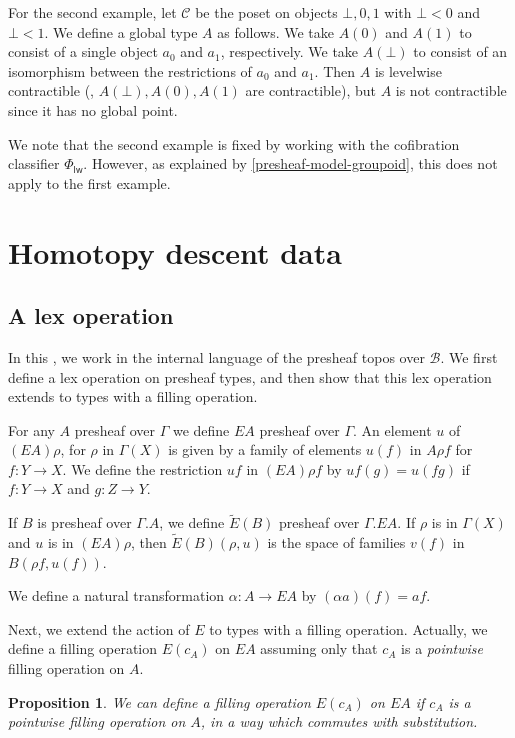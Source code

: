 \documentclass[10pt,a4paper,draft]{article}
\newcommand{\CC}{{\mathcal C}}
\newcommand{\BB}{\mathcal{B}}
\newcommand{\E}{E}
\newcommand{\EE}{\tilde{E}}
\renewcommand{\~}{\widetilde}
\newcommand{\levelwise}{\mathsf{lw}}
\newcommand{\cofunivLW}{\Phi_{\levelwise}}
\newtheorem{proposition}[theorem]{Proposition}
\theoremstyle{definition}
\theoremstyle{remark} %
\begin{document}
For the second example, let $\CC$ be the poset on objects $\bot, 0, 1$ with $\bot < 0$ and $\bot < 1$.
We define a global type $A$ as follows.
We take $A(0)$ and $A(1)$ to consist of a single object $a_0$ and $a_1$, respectively.
We take $A(\bot)$ to consist of an isomorphism between the restrictions of $a_0$ and $a_1$.
Then $A$ is levelwise contractible (\ie, $A(\bot), A(0), A(1)$ are contractible), but $A$ is not contractible since it has no global point.

We note that the second example is fixed by working with the cofibration classifier $\cofunivLW$.
However, as explained by \cref{presheaf-model-groupoid}, this does not apply to the first example.

\section{Homotopy descent data}

\subsection{A lex operation}
\label{sec:a-lex-operation}

In this , we work in the internal language of the presheaf topos
over $\BB$.
We first define a lex operation on presheaf types, and then show that
this lex operation extends to types with a filling operation.

For any $A$ presheaf over $\Gamma$ we define $\E A$ presheaf over $\Gamma$.
An element $u$ of $(\E A)\rho$, for $\rho$ in $\Gamma(X)$ is given
by a family of elements $u(f)$ in $A\rho f$ for $f:Y\rightarrow X$.
We define the restriction $uf$ in $(\E A)\rho f$ by $uf(g) = u(fg)$
if $f:Y\rightarrow X$ and $g:Z\rightarrow Y$.

If $B$ is presheaf over $\Gamma.A$, we define $\EE(B)$ presheaf over  $\Gamma.{\E A}$. If
$\rho$ is in $\Gamma(X)$ and $u$ is in $(\E A)\rho$, then $\EE(B)(\rho,u)$ is the space of families
$v(f)$ in $B(\rho f,u(f))$.

We define a natural transformation $\alpha:A\rightarrow \E A$ by $(\alpha a)(f) = af$.

Next, we extend the action of $\E$ to types with a filling operation. Actually,
we define a filling operation $\E(c_A)$ on $\E A$ assuming only that $c_A$
is a {\em pointwise} filling operation on $A$.

\begin{proposition}\label{Efill}
  We can define a filling operation $\E(c_A)$ on $\E A$ if $c_A$ is a pointwise
  filling operation on $A$, in a way which commutes with substitution.
\end{proposition}
\end{document}
